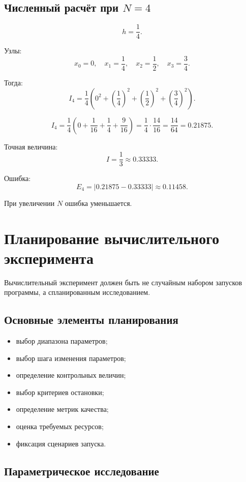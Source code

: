 \documentclass[12pt,a4paper]{article}
\theoremstyle{definition}
\theoremstyle{plain}
\begin{document}
\subsection{Численный расчёт при $N=4$}

\[
h=\frac14.
\]

Узлы:
\[
x_0=0,\quad x_1=\frac14,\quad x_2=\frac12,\quad x_3=\frac34.
\]

Тогда:
\[
I_4
=
\frac14
\left(
0^2+\left(\frac14\right)^2+\left(\frac12\right)^2+\left(\frac34\right)^2
\right).
\]

\[
I_4
=
\frac14
\left(
0+\frac1{16}+\frac14+\frac9{16}
\right)
=
\frac14\cdot\frac{14}{16}
=
\frac{14}{64}
=
0.21875.
\]

Точная величина:
\[
I=\frac13\approx 0.33333.
\]

Ошибка:
\[
E_4
=
\left|
0.21875-0.33333
\right|
\approx
0.11458.
\]

При увеличении $N$ ошибка уменьшается.

\section{Планирование вычислительного эксперимента}

Вычислительный эксперимент должен быть не случайным набором запусков программы, а спланированным исследованием.

\subsection{Основные элементы планирования}

\begin{itemize}
    \item выбор диапазона параметров;
    \item выбор шага изменения параметров;
    \item определение контрольных величин;
    \item выбор критериев остановки;
    \item определение метрик качества;
    \item оценка требуемых ресурсов;
    \item фиксация сценариев запуска.
\end{itemize}

\subsection{Параметрическое исследование}
\end{document}
